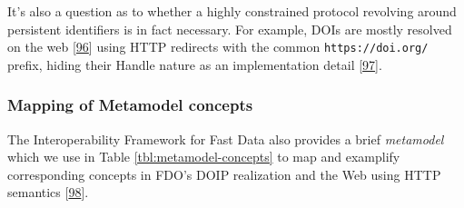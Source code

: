 It's also a question as to whether a highly constrained protocol revolving around persistent identifiers is in fact necessary. For example, DOIs are mostly resolved on the web {[}\protect\hyperlink{ref-1H9iQhQYq}{96}{]} using HTTP redirects with the common \texttt{https://doi.org/} prefix, hiding their Handle nature as an implementation detail {[}\protect\hyperlink{ref-68fzID2k}{97}{]}.

\hypertarget{mapping-of-metamodel-concepts}{%
\subsubsection{Mapping of Metamodel concepts}\label{mapping-of-metamodel-concepts}}

The Interoperability Framework for Fast Data also provides a brief \emph{metamodel} which we use in Table \ref{tbl:metamodel-concepts} to map and examplify corresponding concepts in FDO's DOIP realization and the Web using HTTP semantics {[}\protect\hyperlink{ref-8HJqcF1Q}{98}{]}.

